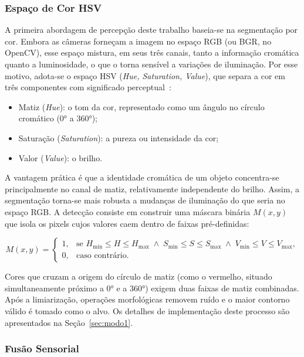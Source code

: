 \subsubsection{Espaço de Cor HSV}

A primeira abordagem de percepção deste trabalho baseia-se na segmentação por
cor. Embora as câmeras forneçam a imagem no espaço RGB (ou BGR, no OpenCV), esse
espaço mistura, em seus três canais, tanto a informação cromática quanto a
luminosidade, o que o torna sensível a variações de iluminação. Por esse motivo,
adota-se o espaço HSV (\textit{Hue, Saturation, Value}), que
separa a cor em três componentes com significado
perceptual~\cite{gonzalez2018digital}:

\begin{itemize}
  \item Matiz (\textit{Hue}): o tom da cor, representado como um ângulo
  no círculo cromático ($0°$ a $360°$);
  \item Saturação (\textit{Saturation}): a pureza ou intensidade da cor;
  \item Valor (\textit{Value}): o brilho.
\end{itemize}

A vantagem prática é que a identidade cromática de um objeto concentra-se
principalmente no canal de matiz, relativamente independente do brilho. Assim, a
segmentação torna-se mais robusta a mudanças de iluminação do que seria no espaço
RGB. A detecção consiste em construir uma máscara binária $M(x,y)$ que isola os
pixels cujos valores caem dentro de faixas pré-definidas:

\begin{equation}
  \label{eq:hsv}
  M(x,y) =
  \begin{cases}
    1, & \text{se } H_{\min} \le H \le H_{\max} \;\wedge\; S_{\min} \le S \le S_{\max} \;\wedge\; V_{\min} \le V \le V_{\max}, \\
    0, & \text{caso contrário}.
  \end{cases}
\end{equation}

Cores que cruzam a origem do círculo de matiz (como o vermelho, situado
simultaneamente próximo a $0°$ e a $360°$) exigem duas faixas de matiz
combinadas. Após a limiarização, operações morfológicas removem ruído e o maior
contorno válido é tomado como o alvo. Os detalhes de implementação deste processo
são apresentados na Seção~\ref{sec:modo1}.

\subsubsection{Fusão Sensorial}

